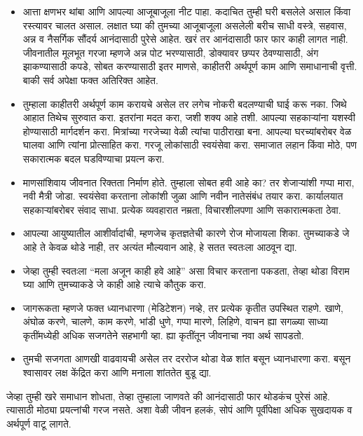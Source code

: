 \begin{itemize}
 \item आत्ता क्षणभर थांबा आणि आपल्या आजूबाजूला नीट पाहा. कदाचित तुम्ही घरी बसलेले असाल किंवा रस्त्यावर चालत असाल. लक्षात घ्या की तुमच्या आजूबाजूला असलेली बरीच साधी वस्त्रे, सहवास, अन्न व नैसर्गिक सौंदर्य आनंदासाठी पुरेसे आहेत. खरं तर आनंदासाठी फार फार काही लागत नाही. जीवनातील मूलभूत गरजा म्हणजे अन्न पोट भरण्यासाठी, डोक्यावर छप्पर ठेवण्यासाठी, अंग झाकण्यासाठी कपडे, सोबत करण्यासाठी इतर माणसे, काहीतरी अर्थपूर्ण काम आणि समाधानाची वृत्ती. बाकी सर्व अपेक्षा फक्त अतिरिक्त आहेत.
\item तुम्हाला काहीतरी अर्थपूर्ण काम करायचे असेल तर लगेच नोकरी बदलण्याची घाई करू नका. जिथे आहात तिथेच सुरुवात करा. इतरांना मदत करा, जशी शक्य आहे तशी. आपल्या सहकाऱ्यांना यशस्वी होण्यासाठी मार्गदर्शन करा. मित्रांच्या गरजेच्या वेळी त्यांचा पाठीराखा बना. आपल्या घरच्यांबरोबर वेळ घालवा आणि त्यांना प्रोत्साहित करा. गरजू लोकांसाठी स्वयंसेवा करा. समाजात लहान किंवा मोठे, पण सकारात्मक बदल घडविण्याचा प्रयत्न करा.
\item माणसांशिवाय जीवनात रिक्तता निर्माण होते. तुम्हाला सोबत हवी आहे का? तर शेजाऱ्यांशी गप्पा मारा, नवी मैत्री जोडा. स्वयंसेवा करताना लोकांशी जुळा आणि नवीन नातेसंबंध तयार करा. कार्यालयात सहकाऱ्यांबरोबर संवाद साधा. प्रत्येक व्यवहारात नम्रता, विचारशीलपणा आणि सकारात्मकता ठेवा.
\item आपल्या आयुष्यातील आशीर्वादांची, म्हणजेच कृतज्ञतेची कारणे रोज मोजायला शिका. तुमच्याकडे जे आहे ते केवळ थोडे नाही, तर अत्यंत मौल्यवान आहे, हे सतत स्वतःला आठवून द्या.
\item जेव्हा तुम्ही स्वतःला “मला अजून काही हवे आहे” असा विचार करताना पकडता, तेव्हा थोडा विराम घ्या आणि तुमच्याकडे जे काही आहे त्याचे कौतुक करा.
\item जागरूकता म्हणजे फक्त ध्यानधारणा (मेडिटेशन) नव्हे, तर प्रत्येक कृतीत उपस्थित राहणे. खाणे, अंघोळ करणे, चालणे, काम करणे, भांडी धुणे, गप्पा मारणे, लिहिणे, वाचन ह्या सगळ्या साध्या कृतींमध्येही अधिक सजगतेने सहभागी व्हा. ह्या कृतींतून जीवनाचा नवा अर्थ सापडतो.
\item तुमची सजगता आणखी वाढवायची असेल तर दररोज थोडा वेळ शांत बसून ध्यानधारणा करा. बसून श्वासावर लक्ष केंद्रित करा आणि मनाला शांततेत बुडू द्या.
 \end{itemize}
जेव्हा तुम्ही खरे समाधान शोधता, तेव्हा तुम्हाला जाणवते की आनंदासाठी फार थोडकंच पुरेसं आहे. त्यासाठी मोठ्या प्रयत्नांची गरज नसते. अशा वेळी जीवन हलकं, सोपं आणि पूर्वीपेक्षा अधिक सुखदायक व अर्थपूर्ण वाटू लागते.


